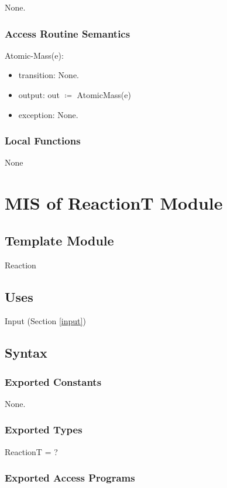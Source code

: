 \documentclass[12pt, titlepage]{article}
\begin{document}
None.

\subsubsection{Access Routine Semantics}

\noindent Atomic-Mass(e):
\begin{itemize}
\item transition: None.
\item output:  out $\coloneqq$ AtomicMass(e)
\item exception: None.
\end{itemize}

\subsubsection{Local Functions}
None

\newpage


\section{MIS of ReactionT Module} \label{Reaction} 

\subsection{Template Module}

Reaction

\subsection{Uses}

 Input (Section \ref{input})

\subsection{Syntax}

\subsubsection{Exported Constants}

None.

\subsubsection{Exported Types}

ReactionT = ?

\subsubsection{Exported Access Programs}
\end{document}
